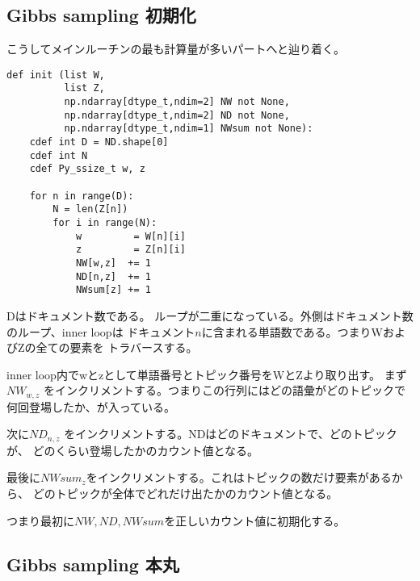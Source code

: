 \documentclass[uplatex]{jsarticle}
\begin{document}
\subsection{Gibbs sampling 初期化}
こうしてメインルーチンの最も計算量が多いパートへと辿り着く。

\begin{lstlisting}
def init (list W,
          list Z,
          np.ndarray[dtype_t,ndim=2] NW not None,
          np.ndarray[dtype_t,ndim=2] ND not None,
          np.ndarray[dtype_t,ndim=1] NWsum not None):
    cdef int D = ND.shape[0]
    cdef int N
    cdef Py_ssize_t w, z
    
    for n in range(D):
        N = len(Z[n])
        for i in range(N):
            w         = W[n][i]
            z         = Z[n][i]
            NW[w,z]  += 1
            ND[n,z]  += 1
            NWsum[z] += 1
\end{lstlisting}    

Dはドキュメント数である。
ループが二重になっている。外側はドキュメント数のループ、inner loopは
ドキュメント$n$に含まれる単語数である。つまりWおよびZの全ての要素を
トラバースする。

inner loop内でwとzとして単語番号とトピック番号をWとZより取り出す。
まず$NW_{w, z}$ をインクリメントする。つまりこの行列にはどの語彙がどのトピックで
何回登場したか、が入っている。

次に$ND_{n, z}$ をインクリメントする。NDはどのドキュメントで、どのトピックが、
どのくらい登場したかのカウント値となる。

最後に$NWsum_{z}$をインクリメントする。これはトピックの数だけ要素があるから、
どのトピックが全体でどれだけ出たかのカウント値となる。

つまり最初に$NW, ND, NWsum$を正しいカウント値に初期化する。

\subsection{Gibbs sampling 本丸}
\end{document}
